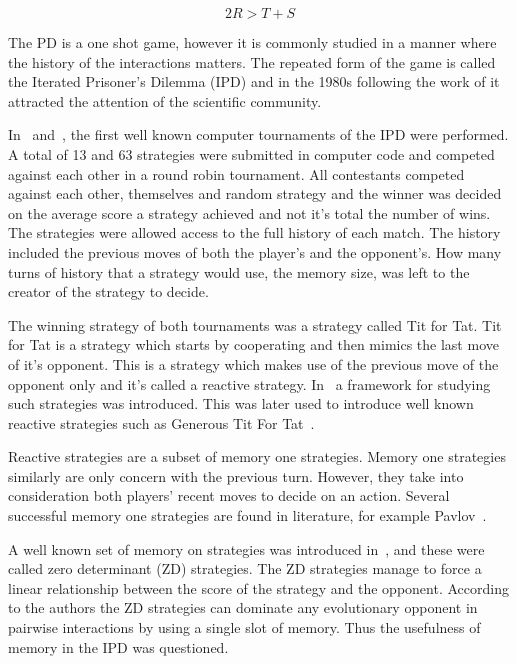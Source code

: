 \documentclass[10pt]{article}
\begin{document}
\begin{equation}\label{eq:pd_constrain_two}
    2R > T + S
\end{equation}

The PD is a one shot game, however it is commonly studied in a manner where the
history of the interactions matters. The repeated form of the game is called the
Iterated Prisoner's Dilemma (IPD) and in the 1980s following the work of
\cite{Axelrod1980a, Axelrod1980b} it attracted the attention of the scientific
community.

In~\cite{Axelrod1980a} and~\cite{Axelrod1980b}, the first well known computer
tournaments of the IPD were performed. A total of 13 and 63 strategies were submitted
in computer code and competed against each other in a round robin tournament.
All contestants competed against each other, themselves and random strategy and the
winner was decided on the average score a strategy achieved and not it's total the number of wins.
The strategies were allowed access to the full history of each match. The history
included the previous moves of both the player's and the opponent's. How many turns of history
that a strategy would use, the memory size, was left to the creator of the strategy to
decide.

The winning strategy of both tournaments was a strategy called Tit for Tat. Tit for Tat
is a strategy which starts by cooperating and then mimics the last move of
it's opponent. This is a strategy which makes use of the previous move of the opponent
only and it's called a reactive strategy. In~\cite{Nowak1989} a framework for
studying such strategies was introduced. This was later used to introduce well known
reactive strategies such as Generous Tit For Tat~\cite{Nowak1990}.

Reactive strategies are a subset of memory one strategies. Memory one strategies
similarly are only concern with the previous turn. However, they take into consideration
both players' recent moves to decide on an action. Several successful memory one
strategies are found in literature, for example Pavlov~\cite{Nowak1993}.

A well known set of memory on strategies was introduced in~\cite{Press2012}, and
these were called zero determinant (ZD) strategies. The ZD strategies manage to force a linear
relationship between the score of the strategy and the opponent. According to the
authors the ZD strategies can dominate any evolutionary opponent in pairwise
interactions by using a single slot of memory. Thus the usefulness of memory in
the IPD was questioned.
\end{document}
